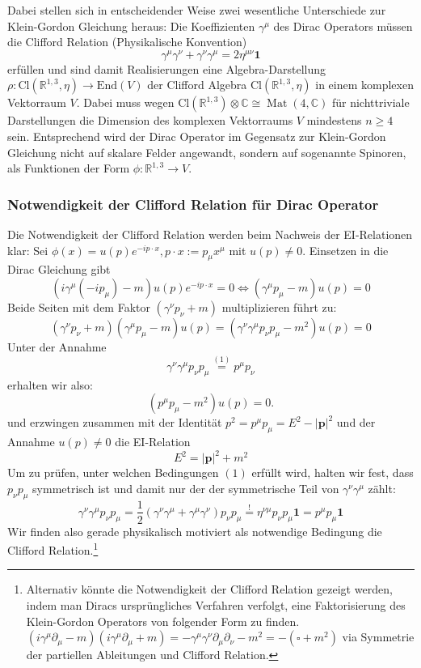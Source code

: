 \documentclass[10pt, letterpaper]{article}
\newcommand{\R}{\mathbb{R}}
\newcommand{\End}{\mathrm{End}}
\newcommand{\Cl}{\mathrm{Cl}}
\begin{document}
Dabei stellen sich in entscheidender Weise zwei wesentliche Unterschiede zur Klein-Gordon Gleichung heraus: Die Koeffizienten $\gamma^\mu$ des Dirac Operators müssen die Clifford Relation (Physikalische Konvention)
$$\gamma^\mu\gamma^\nu + \gamma^\nu \gamma^\mu= 2\eta^{\mu\nu}\mathbf{1}$$
erfüllen und sind damit Realisierungen eine Algebra-Darstellung $\rho: \Cl(\R^{1,3},\eta)\to \End(V)$ der Clifford Algebra $\Cl(\R^{1,3},\eta)$ in einem komplexen Vektorraum $V$. Dabei muss wegen $\mathrm{Cl}\left(\mathbb{R}^{1,3}\right) \otimes \mathbb{C} \cong \operatorname{Mat}(4, \mathbb{C})$ für nichttriviale Darstellungen die Dimension des komplexen Vektorraums $V$ mindestens $n\geq 4$ sein. Entsprechend wird der Dirac Operator im Gegensatz zur Klein-Gordon Gleichung nicht auf skalare Felder angewandt, sondern auf sogenannte Spinoren, als Funktionen der Form $\phi:\R^{1,3}\to V$. 

\subsubsection{Notwendigkeit der Clifford Relation für Dirac Operator}

Die Notwendigkeit der Clifford Relation werden beim Nachweis der EI-Relationen klar: Sei $\phi(x)=u(p)e^{-ip\cdot x}, p \cdot x:=p_\mu x^\mu$ mit $u(p)\neq 0$. Einsetzen in die Dirac Gleichung gibt
$$\left(i \gamma^\mu\left(-i p_\mu\right)-m\right) u(p) e^{-i p \cdot x}=0 \Longleftrightarrow\left(\gamma^\mu p_\mu-m\right) u(p)=0$$
Beide Seiten mit dem Faktor $\left(\gamma^\nu p_\nu+m\right)$ multiplizieren führt zu:
$$\left(\gamma^\nu p_\nu+m\right)\left(\gamma^\mu p_\mu-m\right) u(p)= (\gamma^\nu \gamma^\mu p_\nu p_\mu-m^2)u(p)=0$$
Unter der Annahme
$$\gamma^\nu \gamma^\mu p_\nu p_\mu \overset{(1)}{=} p^\mu p_\nu$$
erhalten wir also:
$$
\left(p^\mu p_\mu-m^2\right) u(p)=0 .
$$
und erzwingen zusammen mit der Identität $p^2=p^\mu p_\mu=E^2-|\mathbf{p}|^2$ und der Annahme $u(p)\neq 0$ die EI-Relation
$$E^2=|\mathbf{p}|^2+m^2$$
Um zu prüfen, unter welchen Bedingungen $(1)$ erfüllt wird, halten wir fest, dass $p_\nu p_\mu$ symmetrisch ist und damit nur der der symmetrische Teil von $\gamma^\nu \gamma^\mu$ zählt:
$$
\gamma^\nu \gamma^\mu p_\nu p_\mu=\frac{1}{2}\left(\gamma^\nu \gamma^\mu+\gamma^\mu \gamma^\nu\right) p_\nu p_\mu\overset{!}{=}\eta^{\nu \mu} p_\nu p_\mu \mathbf{1}=p^\mu p_\mu \mathbf{1}
$$
Wir finden also gerade physikalisch motiviert als notwendige Bedingung die Clifford Relation.\footnote{Alternativ könnte die Notwendigkeit der Clifford Relation gezeigt werden, indem man Diracs ursprüngliches Verfahren verfolgt, eine Faktorisierung des Klein-Gordon Operators von folgender Form zu finden. $(i\gamma^\mu\partial_\mu -m)(i\gamma^\mu\partial_\mu +m)=-\gamma^\mu\gamma^\nu\partial_\mu\partial_\nu -m^2=-(\square +m^2)$ via Symmetrie der partiellen Ableitungen und Clifford Relation.}
\end{document}

